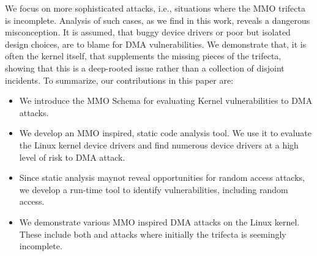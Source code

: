 We focus on more sophisticated attacks, i.e., situations where the MMO trifecta is incomplete. Analysis of such cases, as we find in this work, reveals a dangerous misconception. It is assumed, that buggy device drivers or poor but isolated design choices, are to blame for DMA vulnerabilities. We demonstrate that, it is often the kernel itself, that supplements the missing pieces of the trifecta, showing that this is a deep-rooted issue rather than a collection of disjoint incidents.
%
To summarize, our contributions in this paper are:
\begin{itemize}
    \item We introduce the MMO Schema for evaluating Kernel vulnerabilities to DMA attacks. 
    \item We develop an MMO inspired, static code analysis tool. We use it to evaluate the Linux kernel device drivers and find numerous device drivers at a high level of risk to DMA attack.
    \item Since static analysis maynot reveal opportunities for random access attacks, we develop a run-time tool to identify \subpage{} vulnerabilities, including random access.
    \item We demonstrate various MMO inspired DMA attacks on the Linux kernel. These include both \simple{} and \compound{} attacks where initially the trifecta is seemingly incomplete. 

\end{itemize}







